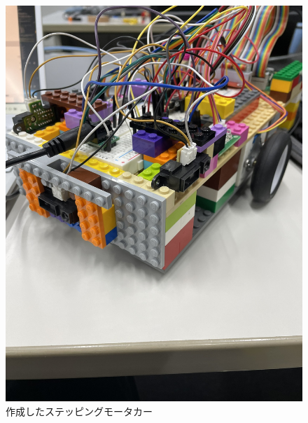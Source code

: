 \documentclass{ltjsarticle} %
\begin{document}
\begin{figure}[H]
\begin{minipage}{0.45\textwidth}
    \includegraphics[width=\textwidth]{raspi4-2.JPEG} %
    \caption{作成したステッピングモータカー} %
    \label{fig:raspi4-2} %
  \end{minipage}
\end{figure}
\end{document}
